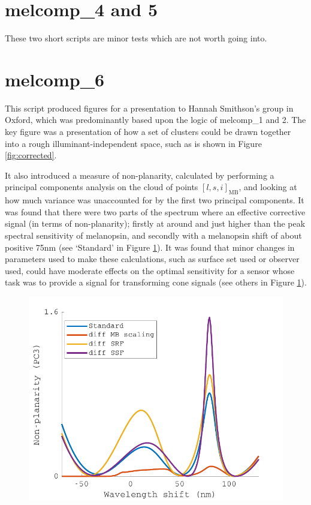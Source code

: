 



\section{melcomp\_4 and 5}
These two short scripts are minor tests which are not worth going into.

\section{melcomp\_6}
This script produced figures for a presentation to Hannah Smithson's group in Oxford, which was predominantly based upon the logic of melcomp\_1 and 2. The key figure was a presentation of how a set of clusters could be drawn together into a rough illuminant-independent space, such as is shown in Figure \ref{fig:corrected}.

It also introduced a measure of non-planarity, calculated by performing a principal components analysis on the cloud of points $[l,s,i]_{\text{MB}}$, and looking at how much variance was unaccounted for by the first two principal components. It was found that there were two parts of the spectrum where an effective corrective signal (in terms of non-planarity); firstly at around and just higher than the peak spectral sensitivity of melanopsin, and secondly with a melanopsin shift of about positive 75nm (see `Standard' in Figure \ref{fig:PC3}). It was found that minor changes in parameters used to make these calculations, such as surface set used or observer used, could have moderate effects on the optimal sensitivity for a sensor whose task was to provide a signal for transforming cone signals (see others in Figure \ref{fig:PC3}).

\begin{figure}[htbp]
    \includegraphics[max width=\textwidth]{figs/comp/melcomp_6/PC3.pdf}
    \caption{}
    \label{fig:PC3}
\end{figure} 

